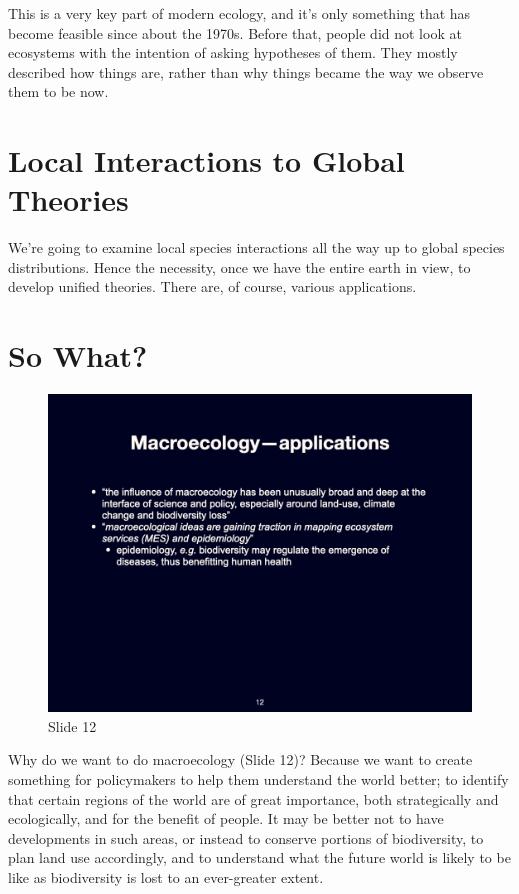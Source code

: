 \documentclass[
  10pt,
]{book}
\begin{document}
This is a very key part of modern ecology, and it's only something that
has become feasible since about the 1970s. Before that, people did not
look at ecosystems with the intention of asking hypotheses of them. They
mostly described how things are, rather than why things became the way
we observe them to be now.

\section{Local Interactions to Global
Theories}\label{local-interactions-to-global-theories}

We're going to examine local species interactions all the way up to
global species distributions. Hence the necessity, once we have the
entire earth in view, to develop unified theories. There are, of course,
various applications.

\section{So What?}\label{so-what}

\begin{figure}[ht]
\centering
\includegraphics[width=0.8\linewidth]{../images/BDC334/BDC334-012.jpeg}
\caption*{Slide 12}
\end{figure}

Why do we want to do macroecology (Slide 12)? Because we want to create
something for policymakers to help them understand the world better; to
identify that certain regions of the world are of great importance, both
strategically and ecologically, and for the benefit of people. It may be
better not to have developments in such areas, or instead to conserve
portions of biodiversity, to plan land use accordingly, and to
understand what the future world is likely to be like as biodiversity is
lost to an ever-greater extent.
\end{document}
